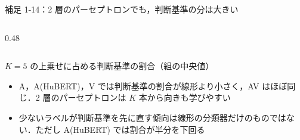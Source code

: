 \begin{frame}{補足 1-14：2 層のパーセプトロンでも，判断基準の分は大きい}
\begin{columns}[T,onlytextwidth]
\begin{column}{0.48\textwidth}
\begin{tabular}{@{}l r rr@{}}
        \bottomrule
      \end{tabular}\par
      {\raggedright\tiny $K=5$ の上乗せに占める判断基準の割合（組の中央値）\par}
      \vspace{0.6em}
      \begin{itemize}\scriptsize\setlength{\itemsep}{4pt}
        \item A，A(HuBERT)，V では判断基準の割合が線形より小さく，AV はほぼ同じ．2 層のパーセプトロンは $K$ 本から向きも学びやすい
        \item 少ないラベルが判断基準を先に直す傾向は線形の分類器だけのものではない．ただし A(HuBERT) では割合が半分を下回る
      \end{itemize}
    \end{column}
  \end{columns}
\end{frame}


